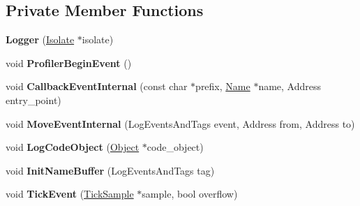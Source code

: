 \subsection*{Private Member Functions}
\begin{DoxyCompactItemize}
\item 
{\bfseries Logger} (\hyperlink{classv8_1_1internal_1_1_isolate}{Isolate} $\ast$isolate)\hypertarget{classv8_1_1internal_1_1_logger_a4ef9af14a0f414fc3cb0cd0119905fa1}{}\label{classv8_1_1internal_1_1_logger_a4ef9af14a0f414fc3cb0cd0119905fa1}

\item 
void {\bfseries Profiler\+Begin\+Event} ()\hypertarget{classv8_1_1internal_1_1_logger_a536131620812d4cf595398945e5c49f3}{}\label{classv8_1_1internal_1_1_logger_a536131620812d4cf595398945e5c49f3}

\item 
void {\bfseries Callback\+Event\+Internal} (const char $\ast$prefix, \hyperlink{classv8_1_1internal_1_1_name}{Name} $\ast$name, Address entry\+\_\+point)\hypertarget{classv8_1_1internal_1_1_logger_aa926a513e3b60e1b1967beeac3affcb7}{}\label{classv8_1_1internal_1_1_logger_aa926a513e3b60e1b1967beeac3affcb7}

\item 
void {\bfseries Move\+Event\+Internal} (Log\+Events\+And\+Tags event, Address from, Address to)\hypertarget{classv8_1_1internal_1_1_logger_a7be9c8ea7d9d423267254faf27cc2835}{}\label{classv8_1_1internal_1_1_logger_a7be9c8ea7d9d423267254faf27cc2835}

\item 
void {\bfseries Log\+Code\+Object} (\hyperlink{classv8_1_1internal_1_1_object}{Object} $\ast$code\+\_\+object)\hypertarget{classv8_1_1internal_1_1_logger_affdaa044e4ec347cb0853d9d91c63ff9}{}\label{classv8_1_1internal_1_1_logger_affdaa044e4ec347cb0853d9d91c63ff9}

\item 
void {\bfseries Init\+Name\+Buffer} (Log\+Events\+And\+Tags tag)\hypertarget{classv8_1_1internal_1_1_logger_ae62beeb292a57f0230ad7673315eb413}{}\label{classv8_1_1internal_1_1_logger_ae62beeb292a57f0230ad7673315eb413}

\item 
void {\bfseries Tick\+Event} (\hyperlink{structv8_1_1internal_1_1_tick_sample}{Tick\+Sample} $\ast$sample, bool overflow)\hypertarget{classv8_1_1internal_1_1_logger_ad7ddaeca61935282198150c893257347}{}\label{classv8_1_1internal_1_1_logger_ad7ddaeca61935282198150c893257347}


\end{DoxyCompactItemize}
